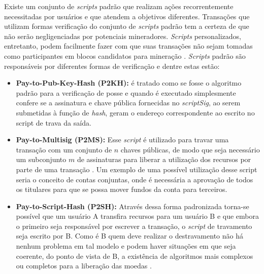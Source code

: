 %
Existe um conjunto de \textit{scripts} padrão que realizam ações recorrentemente necessitadas por usuários e que atendem a objetivos diferentes. Transações que utilizam formas verificação do conjunto de \textit{scripts} padrão tem a certeza de que não serão negligenciadas por potenciais mineradores. \textit{Scripts} personalizados, entretanto, podem facilmente fazer com que suas transações não sejam tomadas como participantes em blocos candidatos para mineração \cite{blockchain:mastering_bitcoin}. \textit{Scripts} padrão são responsáveis por diferentes formas de verificação e dentre estas estão: 
\begin{itemize}
    \item \textbf{Pay-to-Pub-Key-Hash (P2KH):} é tratado como se fosse o algoritmo padrão para a verificação de posse e quando é executado simplesmente confere se a assinatura e chave pública fornecidas no \textit{scriptSig}, ao serem submetidas à função de \textit{hash}, geram o endereço correspondente ao escrito no script de trava da saída.
    \item \textbf{Pay-to-Multisig (P2MS):} Esse \textit{script} é utilizado para travar uma transação com um conjunto de $n$ chaves públicas, de modo que seja necessário um subconjunto $m$ de assinaturas para liberar a utilização dos recursos por parte de uma transação \cite{blockchain:mastering_bitcoin}. Um exemplo de uma possível utilização desse script seria o conceito de contas conjuntas, onde é necessária a aprovação de todos os titulares para que se possa mover fundos da conta para terceiros.
    \item \textbf{Pay-to-Script-Hash (P2SH):} Através dessa forma padronizada torna-se possível que um usuário A transfira recursos para um usuário B e que embora o primeiro seja responsável por escrever a transação, o \textit{script} de travamento seja escrito por B. Como é B quem deve realizar o destravamento não há nenhum problema em tal modelo e podem haver situações em que seja coerente, do ponto de vista de B, a existência de algoritmos mais complexos ou completos para a liberação das moedas \cite{smart_contracts:learn_me_a_bitcoin}.

\end{itemize}
